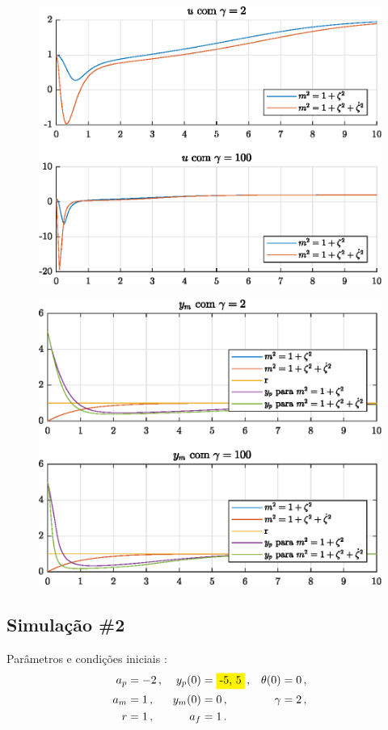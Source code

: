 \begin{figure}[H]
  \centering
  \includegraphics[width=12cm]{figs/u/gamma2gamma100.eps} 
\end{figure}

\begin{figure}[H]
  \centering
  \includegraphics[width=12cm]{figs/yp/gamma2gamma100.eps} 
\end{figure}

\newpage%
\subsection{Simulação \#2}
\bigskip%
Parâmetros e condições iniciais  :
%
\begin{align*}
  a_p &= -2\,,  &  y_p(0) &= \HI{-5, 5}\,, & \theta(0) &= 0\,, \\
  a_m &= 1\,,   &  y_m(0) &= 0\,, & \gamma &= 2\,, \\
  r &= 1\,, & a_f &= 1\,.
\end{align*}

